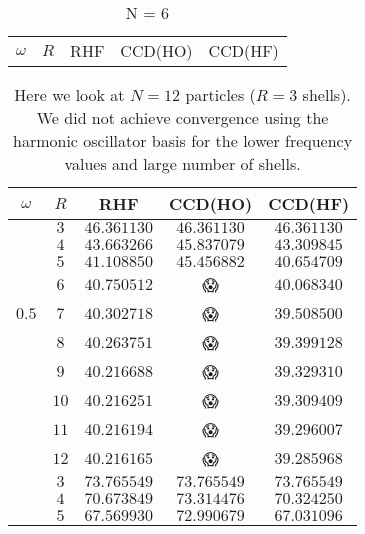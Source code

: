 \documentclass[
    a4paper, aps, twocolumn, floatfix, superscriptaddress,
    nofootinbib]{revtex4-1}
\newcommand{\nan}{\DejaSans 😱}
\newcommand{\1}{\mathds{1}}
\begin{document}
    \begin{table}
        \centering
        \caption{N = 6}
        \begin{ruledtabular}
            \begin{tabular}{c|c|ccc}
                $\omega$ & $R$ & RHF & CCD(HO) & CCD(HF)

            \end{tabular}
        \end{ruledtabular}
        \label{tab:N6}
    \end{table}

    \begin{table}
        \centering
        \caption{Here we look at $N = 12$ particles ($R = 3$ shells).  We did
        not achieve convergence using the harmonic oscillator basis for the
        lower frequency values and large number of shells.}
        \begin{ruledtabular}
            \begin{tabular}{c|c|ccc}
                $\omega$ & $R$ & RHF & CCD(HO) & CCD(HF) \\
                \hline
                      & $3$ & $46.361130$ & $46.361130$ & $46.361130$ \\
                      & $4$ & $43.663266$ & $45.837079$ & $43.309845$ \\
                      & $5$ & $41.108850$ & $45.456882$ & $40.654709$ \\
                      & $6$ & $40.750512$ & \nan & $40.068340$ \\
                $0.5$ & $7$ & $40.302718$ & \nan & $39.508500$ \\
                      & $8$ & $40.263751$ & \nan & $39.399128$ \\
                      & $9$ & $40.216688$ & \nan & $39.329310$ \\
                      & $10$ & $40.216251$ & \nan & $39.309409$ \\
                      & $11$ & $40.216194$ & \nan & $39.296007$ \\
                      & $12$ & $40.216165$ & \nan & $39.285968$ \\
                \hline
                      & $3$ & $73.765549$ & $73.765549$ & $73.765549$ \\
                      & $4$ & $70.673849$ & $73.314476$ & $70.324250$ \\
                      & $5$ & $67.569930$ & $72.990679$ & $67.031096$ \\

\end{tabular}
\end{ruledtabular}
\end{table}
\end{document}

